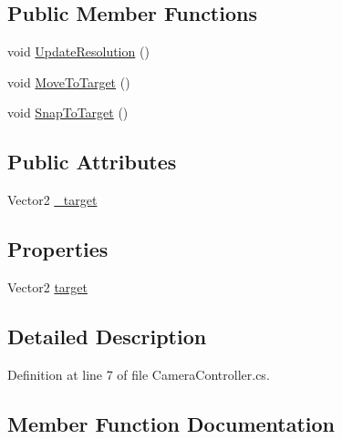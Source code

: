 \subsection*{Public Member Functions}
\begin{DoxyCompactItemize}
\item 
void \mbox{\hyperlink{class_camera_controller_a4894dc3111b871a8bf5ff422d30c1689}{Update\+Resolution}} ()
\item 
void \mbox{\hyperlink{class_camera_controller_a79831008bb764801df46a3c91343a524}{Move\+To\+Target}} ()
\item 
void \mbox{\hyperlink{class_camera_controller_a9e2d7df7c696c1c2ce48384933c5d1ab}{Snap\+To\+Target}} ()
\end{DoxyCompactItemize}
\subsection*{Public Attributes}
\begin{DoxyCompactItemize}
\item 
Vector2 \mbox{\hyperlink{class_camera_controller_ac211a3ef97d78311cab3215e02dcaa8e}{\+\_\+target}}
\end{DoxyCompactItemize}
\subsection*{Properties}
\begin{DoxyCompactItemize}
\item 
Vector2 \mbox{\hyperlink{class_camera_controller_a1557d6d0a4b70b6bb53f5a913329d0d0}{target}}
\end{DoxyCompactItemize}


\subsection{Detailed Description}


Definition at line 7 of file Camera\+Controller.\+cs.



\subsection{Member Function Documentation}
\mbox{\label{class_camera_controller_a79831008bb764801df46a3c91343a524}} 
